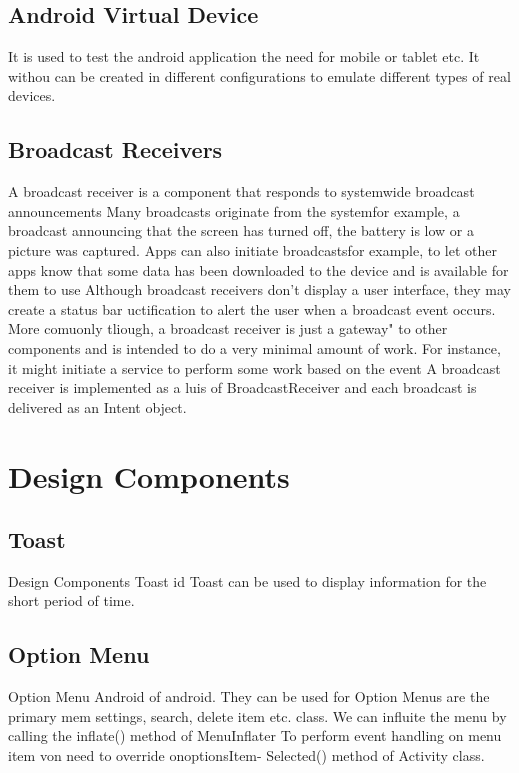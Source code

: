 \documentclass[twoside,a4paper,16pt]{book}
\begin{document}
\begin{itemize}
\begin{enumerate}
\begin{enumerate}
\subsection{Android Virtual Device}
It is used to test the android application the need for mobile or tablet etc. It withou can be created in different configurations to emulate different types of real devices.\\

\subsection{Broadcast Receivers}
A broadcast receiver is a component that responds to systemwide broadcast announcements Many broadcasts originate from the systemfor example, a broadcast announcing that the screen has turned off, the battery is low or a picture was captured. Apps can also initiate broadcastsfor example, to let other apps know that some data has been downloaded to the device and is available for them to use Although broadcast receivers don't display a user interface, they may create a status bar uctification to alert the user when a broadcast event occurs. More comuonly tliough, a broadcast receiver is just a gateway" to other components and is intended to do a very minimal amount of work. For instance, it might initiate a service to perform some work based on the event A broadcast receiver is implemented as a luis of BroadcastReceiver and each broadcast is delivered as an Intent object.\\

\section{Design Components}

\subsection{Toast}
Design Components Toast id Toast can be used to display information for the short period of time.\\


\subsection{Option Menu}
 Option Menu Android of android. They can be used for Option Menus are the primary mem settings, search, delete item etc. class. We can influite the menu by calling the inflate() method of MenuInflater To perform event handling on menu item von need to override onoptionsItem- Selected() method of Activity class.\\



\end{enumerate}
\end{enumerate}
\end{itemize}
\end{document}
